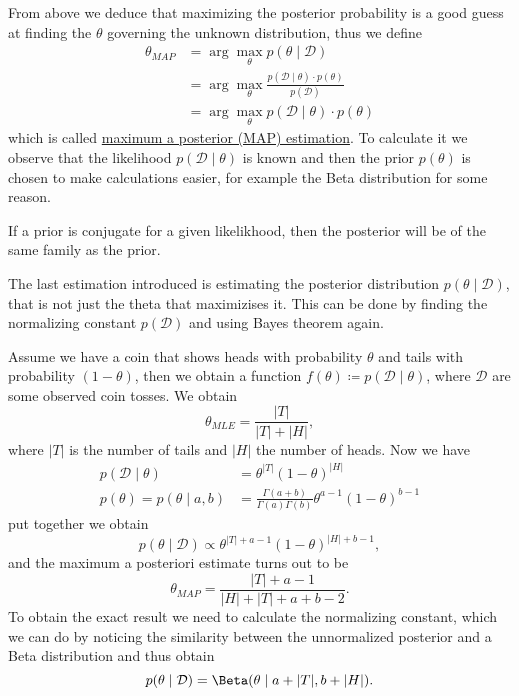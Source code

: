 \documentclass[12 pt]{article}        	%
\begin{document}
From above we deduce that maximizing the posterior probability is a good guess at finding the $ \theta $ governing the unknown distribution, thus we define
\begin{align*}
    \theta_{ MAP } 
    &= \arg \max_{ \theta } p ( \theta \mid \mathcal{ D } )
    \\
    &=
    \arg \max_{ \theta } \frac{ p ( \mathcal{ D } \mid \theta ) \cdot p ( \theta ) }{ p ( \mathcal{ D } ) }
    \\
    &=
    \arg \max_{ \theta } p ( \mathcal{ D } \mid \theta ) \cdot p ( \theta ) 
\end{align*}
which is called \underline{maximum a posterior (MAP) estimation}.
To calculate it we observe that the likelihood $ p ( \mathcal{ D } \mid \theta ) $ is known and then the prior $ p ( \theta ) $ is
chosen to make calculations easier, for example the Beta distribution for some reason.

If a prior is conjugate for a given likelikhood, then the posterior will be of the same family as the prior.


The last estimation introduced is estimating the posterior distribution $ p ( \theta \mid \mathcal{ D } ) $, that is not just the theta that maximizises it.
This can be done by finding the normalizing constant $ p ( \mathcal{ D } ) $ and using Bayes theorem again.

\begin{exmp}
    Assume we have a coin that shows heads with probability $ \theta $ and tails with probability $ ( 1 - \theta ) $, then we obtain a function $ f ( \theta ) \coloneqq p ( \mathcal{ D } \mid \theta ) $, where $ \mathcal{ D } $ are some observed coin tosses.
    We obtain 
    \[
        \theta_{ MLE } 
        =
        \frac{ \lvert T \rvert }{ \lvert T \rvert + \lvert H \rvert },
    \]
    where    $ \lvert T \rvert $ is the number of tails and $ \lvert H \rvert $ the number of heads.
    Now we have
    \begin{align*}
        p ( \mathcal{ D } \mid \theta )
        &=
        \theta^{ \lvert T \rvert } ( 1 - \theta )^{ \lvert H \rvert }
        \\
        p ( \theta )
        =
        p ( \theta \mid a , b )
        &=
        \frac{ \Gamma ( a  + b ) }{ \Gamma ( a ) \Gamma ( b ) } \theta^{ a- 1 } ( 1 - \theta )^{ b - 1 }
    \end{align*}
    put together we obtain
    \[
        p( \theta \mid \mathcal{ D } ) 
        \propto
        \theta^{ \lvert T \rvert + a - 1 } ( 1 - \theta )^{ \lvert H \rvert + b - 1 },
    \]
    and the maximum a posteriori estimate turns out to be
    \[
        \theta_{ MAP } 
        =
        \frac{ \lvert T \rvert + a - 1 }{ \lvert H \rvert + \lvert T \rvert + a + b - 2 }.
    \]
    To obtain the exact result we need to calculate the normalizing constant, which we can do by noticing the similarity between the unnormalized posterior and a Beta distribution and thus obtain
    \[
        p ( \theta \mid \mathcal{ D } )
        =
        \Beta ( \theta \mid a + \lvert T \rvert, b + \lvert H \rvert ).
    \]
\end{exmp}
\end{document}
